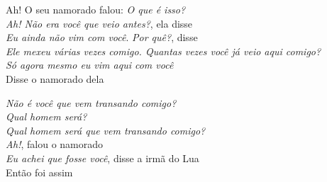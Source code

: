 \begin{linenumbers}\begingroup\raggedright
\noindent Ah! O seu namorado falou: \textit{O que é isso?}\\
\textit{Ah! Não era você que veio antes?}, ela disse\\
\textit{Eu ainda não vim com você}. \textit{Por quê?}, disse\\
\textit{Ele mexeu várias vezes comigo. Quantas vezes você já veio aqui comigo?}\\
\textit{Só agora mesmo eu vim aqui com você}\\
Disse o namorado dela
\end{linenumbers}\endgroup

\bigskip

\begin{linenumbers}\begingroup\raggedright
\noindent \textit{Não é você que vem transando comigo?}\\
\textit{Qual homem será?}\\
\textit{Qual homem será que vem transando comigo?}\\
\textit{Ah!}, falou o namorado\\
\textit{Eu achei que fosse você}, disse a irmã do Lua\\
Então foi assim
\end{linenumbers}\endgroup

\bigskip

